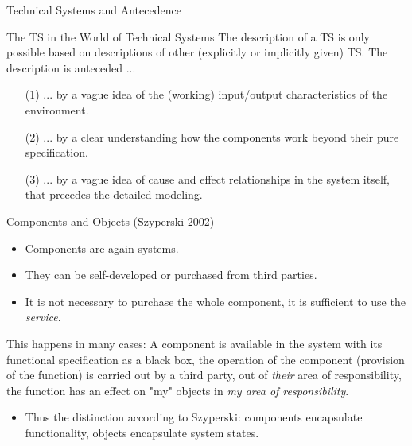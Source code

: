 \documentclass{beamer}
\begin{document}
\begin{frame}{Technical Systems and Antecedence}
  \begin{block}{The TS in the World of Technical Systems}
    The description of a TS is only possible based on descriptions of other
    (explicitly or implicitly given) TS. The description is anteceded ...
    \begin{itemize}
    \item[(1)] ... by a vague idea of the (working) input/output
      characteristics of the environment.
    \item [(2)] ... by a clear understanding how the components work beyond
      their pure specification.
    \item [(3)] ... by a vague idea of cause and effect relationships in the
      system itself, that precedes the detailed modeling.
    \end{itemize}
  \end{block}
\end{frame}

\begin{frame}{Components and Objects}
  (Szyperski 2002)
  \begin{itemize}
  \item Components are again systems.
  \item They can be self-developed or purchased from third parties. 
  \item It is not necessary to purchase the whole component, it is sufficient
    to use the \emph{service}.
  \end{itemize}
  This happens in many cases: A component is available in the system with its
  functional specification as a black box, the operation of the component
  (provision of the function) is carried out by a third party, out of
  \emph{their} area of responsibility,  the function has an effect on "my"
  objects in \emph{my area of responsibility}.
  \begin{itemize}
  \item Thus the distinction according to Szyperski: components encapsulate
    functionality, objects encapsulate system states. 
  \end{itemize}
\end{frame}
\end{document}
